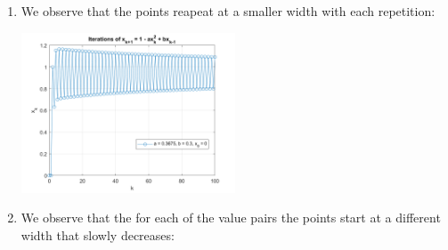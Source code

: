 \documentclass{article}
\begin{document}
\begin{enumerate} [label=\Alph*]
  \clearpage 
  \item We observe that the points reapeat at a smaller width with each repetition: 
  \begin{center} \includegraphics[width=0.5\textwidth]{Problem3_C.png} \end{center}
  \item We observe that the for each of the value pairs the points start at a different width that slowly decreases:
  

\end{enumerate}
\end{document}
